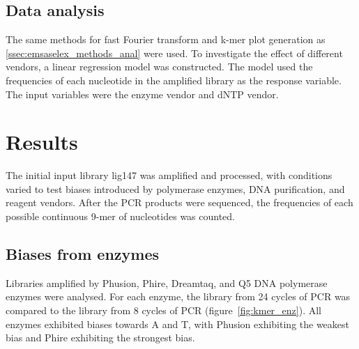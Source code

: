 \documentclass[parskip=full, numbers=noenddot]{scrreprt}
\begin{document}
\subsection{Data analysis}
\label{ssec:pcrbias_methods_anal}

The same methods for fast Fourier transform and k-mer plot generation as \ref{ssec:emsaselex_methods_anal} were used.
To investigate the effect of different vendors, a linear regression model was constructed.  The model used the frequencies of each nucleotide in the amplified library as the response variable.  The input variables were the enzyme vendor and dNTP vendor.

\section{Results}
\label{sec:pcrbias_results}

The initial input library lig147 was amplified and processed, with conditions varied to test biases introduced by polymerase enzymes, DNA purification, and reagent vendors.  After the PCR products were sequenced, the frequencies of each possible continuous 9-mer of nucleotides was counted.


\subsection{Biases from enzymes}
\label{ssec:pcrbias_result_enz}

Libraries amplified by Phusion, Phire, Dreamtaq, and Q5 DNA polymerase enzymes were analysed.  For each enzyme, the library from 24 cycles of PCR was compared to the library from 8 cycles of PCR (figure~\ref{fig:kmer_enz}).  All enzymes exhibited biases towards A and T, with Phusion exhibiting the weakest bias and Phire exhibiting the strongest bias.
\end{document}
